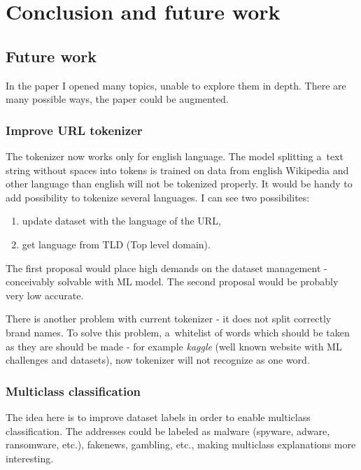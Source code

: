 \chapter{Conclusion and future work}\label{ch:conclusion-and-future-work}

\section{Future work}\label{sec:future-work}

In the paper I opened many topics, unable to explore them in depth.
There are many possible ways, the paper could be augmented.

\subsection{Improve URL tokenizer}\label{subsec:improve-url-tokenizer}

The tokenizer now works only for english language.
The model splitting a~text string without spaces into tokens is trained on data from english Wikipedia and other language than english will not be tokenized properly.
It would be handy to add possibility to tokenize several languages.
I can see two possibilites:

\begin{enumerate}
    \item update dataset with the language of the URL,
    \item get language from TLD (Top level domain).
\end{enumerate}

The first proposal would place high demands on the dataset management - conceivably solvable with ML model.
The second proposal would be probably very low accurate.

There is another problem with current tokenizer - it does not split correctly brand names.
To solve this problem, a~whitelist of words which should be taken as they are should be made - for example \textit{kaggle} (well known website with ML challenges and datasets), now tokenizer will not recognize as one word.

\subsection{Multiclass classification}\label{subsec:multiclass-classification}

The idea here is to improve dataset labels in order to enable multiclass classification.
The addresses could be labeled as malware (spyware, adware, ransomware, etc.), fakenews, gambling, etc., making multiclass explanations more interesting.

